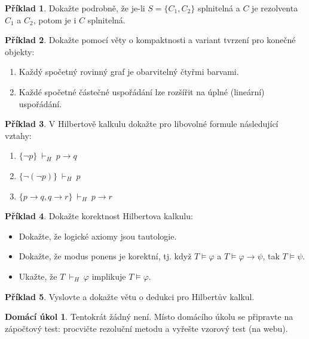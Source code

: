 \documentclass[a4paper]{article}
\theoremstyle{plain}
\theoremstyle{definition}
\newtheorem{problem}{Příklad}
\newtheorem*{ukol}{Domácí úkol}
\begin{document}
\medskip\begin{problem}
    Dokažte podrobně, že je-li $S=\{C_1,C_2\}$ splnitelná a $C$ je rezolventa $C_1$ a $C_2$, potom je i $C$ splnitelná.
\end{problem}

    
\medskip\begin{problem} Dokažte pomocí věty o kompaktnosti a variant tvrzení pro konečné objekty:
\begin{enumerate}
    \item Každý spočetný rovinný graf je obarvitelný čtyřmi barvami.
    \item Každé spočetné částečné uspořádání lze rozšířit na úplné (lineární) uspořádání.
\end{enumerate}

\end{problem}



\medskip\begin{problem}
V Hilbertově kalkulu dokažte pro libovolné formule následující vztahy:
\begin{enumerate}
    \item $\{\neg p\}\ \vdash_H\ p\to q$
    \item $\{\neg(\neg p)\}\ \vdash_H\ p$
    \item $\{p\to q,q \to r\}\ \vdash_H\ p\to r$
\end{enumerate}    
\end{problem}

\medskip\begin{problem}
    Dokažte korektnost Hilbertova kalkulu:
    \begin{itemize}
        \item Dokažte, že logické axiomy jsou tautologie.
        \item Dokažte, že modus ponens je korektní, tj. když $T\models\varphi$ a $T\models\varphi\to\psi$, tak $T\models\psi$.
        \item Ukažte, že $T\ \vdash_H\ \varphi$ implikuje $T\models\varphi$.
    \end{itemize}
    \end{problem}
    
\medskip\begin{problem}
    Vyslovte a dokažte větu o dedukci pro Hilbertův kalkul.
\end{problem}
    


\medskip\begin{ukol}
Tentokrát žádný není. Místo domácího úkolu se připravte na zápočtový test: procvičte rezoluční metodu a vyřešte vzorový test (na webu).
\end{ukol}
\end{document}
